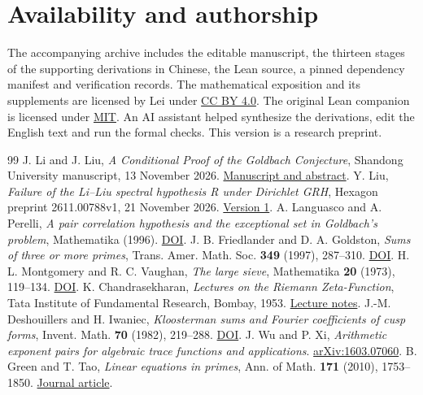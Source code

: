 \documentclass[11pt,a4paper]{article}
\begin{document}
\section*{Availability and authorship}
The accompanying archive includes the editable manuscript, the thirteen stages of the supporting derivations in Chinese, the Lean source, a pinned dependency manifest and verification records. The mathematical exposition and its supplements are licensed by Lei under \href{https://creativecommons.org/licenses/by/4.0/}{CC BY 4.0}. The original Lean companion is licensed under \href{https://opensource.org/license/mit}{MIT}. An AI assistant helped synthesize the derivations, edit the English text and run the formal checks. This version is a research preprint.

\begin{thebibliography}{99}
 J. Li and J. Liu, \emph{A Conditional Proof of the Goldbach Conjecture}, Shandong University manuscript, 13 November 2026. \href{https://mrc.sdu.edu.cn/english/info/1018/1514.htm}{Manuscript and abstract}.
 Y. Liu, \emph{Failure of the Li--Liu spectral hypothesis R under Dirichlet GRH}, Hexagon preprint 2611.00788v1, 21 November 2026. \href{https://hexagonmath.org/2611.00788v1}{Version 1}.
 A. Languasco and A. Perelli, \emph{A pair correlation hypothesis and the exceptional set in Goldbach's problem}, Mathematika (1996). \href{https://doi.org/10.1112/S0025579300011827}{DOI}.
 J. B. Friedlander and D. A. Goldston, \emph{Sums of three or more primes}, Trans. Amer. Math. Soc. \textbf{349} (1997), 287--310. \href{https://doi.org/10.1090/S0002-9947-97-01652-8}{DOI}.
 H. L. Montgomery and R. C. Vaughan, \emph{The large sieve}, Mathematika \textbf{20} (1973), 119--134. \href{https://doi.org/10.1112/S0025579300004708}{DOI}.
 K. Chandrasekharan, \emph{Lectures on the Riemann Zeta-Function}, Tata Institute of Fundamental Research, Bombay, 1953. \href{https://mathweb.tifr.res.in/Documents/Publications/Lectures/tifr01.pdf}{Lecture notes}.
 J.-M. Deshouillers and H. Iwaniec, \emph{Kloosterman sums and Fourier coefficients of cusp forms}, Invent. Math. \textbf{70} (1982), 219--288. \href{https://doi.org/10.1007/BF01390728}{DOI}.
 J. Wu and P. Xi, \emph{Arithmetic exponent pairs for algebraic trace functions and applications}. \href{https://arxiv.org/abs/1603.07060}{arXiv:1603.07060}.
 B. Green and T. Tao, \emph{Linear equations in primes}, Ann. of Math. \textbf{171} (2010), 1753--1850. \href{https://annals.math.princeton.edu/2010/171-3/p08}{Journal article}.
\end{thebibliography}
\end{document}
